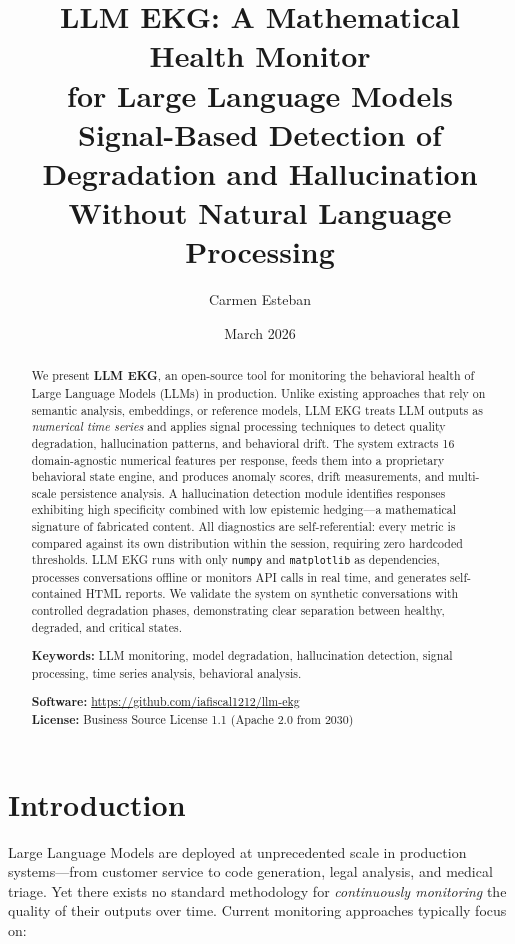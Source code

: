 \documentclass[11pt,a4paper]{article}
\title{%
\textbf{LLM EKG: A Mathematical Health Monitor\\for Large Language Models}\\[6pt]
\large Signal-Based Detection of Degradation and Hallucination\\Without Natural Language Processing%
}
\author[1]{Carmen Esteban}
\affil[1]{IAFISCAL \& PARTNERS, Madrid, Spain}
\date{March 2026}
\begin{document}
\maketitle

\begin{abstract}
We present \textbf{LLM EKG}, an open-source tool for monitoring the behavioral health of Large Language Models (LLMs) in production. Unlike existing approaches that rely on semantic analysis, embeddings, or reference models, LLM EKG treats LLM outputs as \emph{numerical time series} and applies signal processing techniques to detect quality degradation, hallucination patterns, and behavioral drift. The system extracts 16 domain-agnostic numerical features per response, feeds them into a proprietary behavioral state engine, and produces anomaly scores, drift measurements, and multi-scale persistence analysis. A hallucination detection module identifies responses exhibiting high specificity combined with low epistemic hedging---a mathematical signature of fabricated content. All diagnostics are self-referential: every metric is compared against its own distribution within the session, requiring zero hardcoded thresholds. LLM EKG runs with only \texttt{numpy} and \texttt{matplotlib} as dependencies, processes conversations offline or monitors API calls in real time, and generates self-contained HTML reports. We validate the system on synthetic conversations with controlled degradation phases, demonstrating clear separation between healthy, degraded, and critical states.

\medskip
\noindent\textbf{Keywords:} LLM monitoring, model degradation, hallucination detection, signal processing, time series analysis, behavioral analysis.

\medskip
\noindent\textbf{Software:} \url{https://github.com/iafiscal1212/llm-ekg}\\
\textbf{License:} Business Source License 1.1 (Apache 2.0 from 2030)
\end{abstract}

\section{Introduction}

Large Language Models are deployed at unprecedented scale in production systems---from customer service to code generation, legal analysis, and medical triage. Yet there exists no standard methodology for \emph{continuously monitoring} the quality of their outputs over time. Current monitoring approaches typically focus on:
\end{document}

